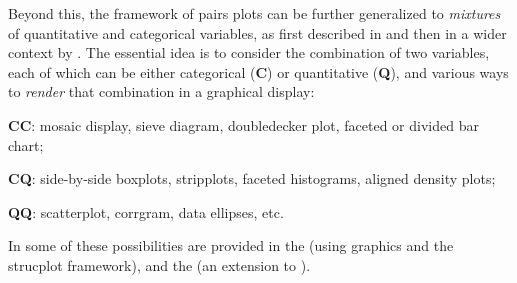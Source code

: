 \documentclass[10pt,krantz2]{krantz}\usepackage[]{graphicx}\usepackage[]{color}
\begin{document}
Beyond this, the framework of pairs plots can be further generalized to \emph{mixtures}
of quantitative and categorical variables, as first described in \citet{Friendly:03:apa}
and then in a wider context by \citet{Emerson-etal:2013,Friendly:2013:genpairs}.
The essential idea is to consider the combination of two variables, each of which can
be either categorical (\textbf{C}) or quantitative (\textbf{Q}), and various ways to \emph{render} that
combination in a graphical display:

\begin{description*}
  \item[\textbf{CC}:] mosaic display, sieve diagram, doubledecker plot, faceted or divided bar chart;
  \item[\textbf{CQ}:] side-by-side boxplots, stripplots, faceted histograms, aligned density plots;
  \item[\textbf{QQ}:] scatterplot, corrgram, data ellipses, etc.
\end{description*}
In \R some of these possibilities are provided in the  (using  graphics
and the  strucplot framework), and the 
(an extension to ).
\end{document}
